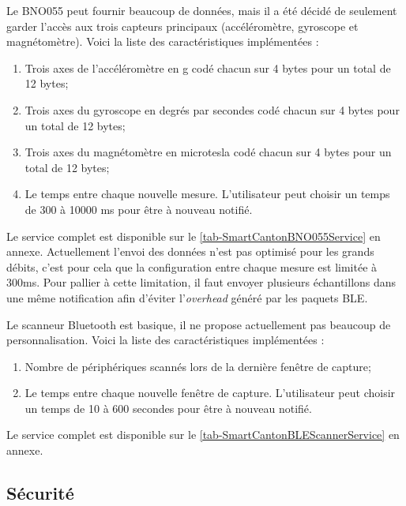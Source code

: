 Le BNO055 peut fournir beaucoup de données, mais il a été décidé de seulement garder l'accès aux trois capteurs principaux (accéléromètre, gyroscope et magnétomètre). Voici la liste des caractéristiques implémentées : 
\begin{enumerate}
    \item Trois axes de l'accéléromètre en g codé chacun sur 4 bytes pour un total de 12 bytes;
    \item Trois axes du gyroscope en degrés par secondes codé chacun sur 4 bytes pour un total de 12 bytes;
    \item Trois axes du magnétomètre en microtesla codé chacun sur 4 bytes pour un total de 12 bytes;
    \item Le temps entre chaque nouvelle mesure. L'utilisateur peut choisir un temps de 300 à 10000 ms pour être à nouveau notifié.
\end{enumerate}

Le service complet est disponible sur le \cref{tab-SmartCantonBNO055Service} en annexe. Actuellement l'envoi des données n'est pas optimisé pour les grands débits, c'est pour cela que la configuration entre chaque mesure est limitée à 300ms. Pour pallier à cette limitation, il faut envoyer plusieurs échantillons dans une même notification afin d'éviter l'\textit{overhead} généré par les paquets BLE.

\FloatBarrier
{}

Le scanneur Bluetooth est basique, il ne propose actuellement pas beaucoup de personnalisation. Voici la liste des caractéristiques implémentées : 
\begin{enumerate}
    \item Nombre de périphériques scannés lors de la dernière fenêtre de capture;
    \item Le temps entre chaque nouvelle fenêtre de capture. L'utilisateur peut choisir un temps de 10 à 600 secondes pour être à nouveau notifié.
\end{enumerate}

Le service complet est disponible sur le \cref{tab-SmartCantonBLEScannerService} en annexe.


\subsection{Sécurité}
\label{sec-smartcanton_devbox_security}

